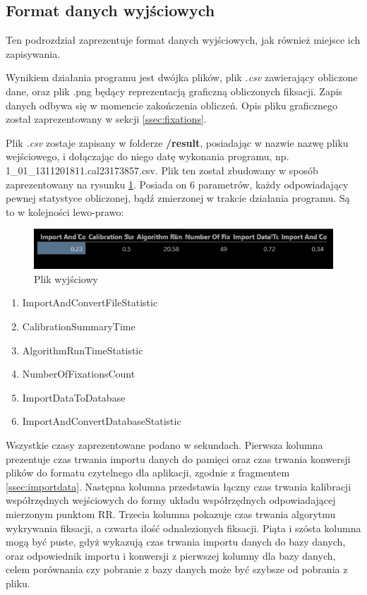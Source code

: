 \subsection{Format danych wyjściowych}
Ten podrozdział zaprezentuje format danych wyjściowych, jak również miejsce ich zapisywania.\par
Wynikiem działania programu jest dwójka plików, plik \emph{.csv} zawierający obliczone dane, oraz plik .png będący reprezentacją graficzną obliczonych fiksacji. Zapis danych odbywa się w momencie zakończenia obliczeń. Opis pliku graficznego został zaprezentowany w sekcji \ref{ssec:fixations}.\par
Plik \emph{.csv} zostaje zapisany w folderze \textbf{/result}, posiadając w nazwie nazwę pliku wejściowego, i dołączając do niego datę wykonania programu, np. 1\_01\_1311201811.cal23\-173857.csv.
Plik ten został zbudowany w sposób zaprezentowany na rysunku \ref{fig:exportfile}. Posiada on 6 parametrów, każdy odpowiadający pewnej statystyce obliczonej, bądź zmierzonej w trakcie działania programu. Są to w kolejności lewo-prawo:
\begin{figure}[H]
        \centering
        \captionsetup{justification=centering,margin=2cm}
        \includegraphics[width=0.8\linewidth]{resources/exportfile.png}
        \caption{Plik wyjściowy}
        \label{fig:exportfile}
\end{figure}
\begin{enumerate}
        \itemsep1em 
        \item ImportAndConvertFileStatistic
        \item CalibrationSummaryTime
        \item AlgorithmRunTimeStatistic
        \item NumberOfFixationsCount
        \item ImportDataToDatabase
        \item ImportAndConvertDatabaseStatistic
\end{enumerate}
Wszystkie czasy zaprezentowane podano w sekundach. Pierwsza kolumna prezentuje czas trwania importu danych do pamięci oraz czas trwania konwersji plików do formatu czytelnego dla aplikacji, zgodnie z fragmentem \ref{ssec:importdata}. Następna kolumna przedstawia łączny czas trwania kalibracji współrzędnych wejściowych do formy układu współrzędnych odpowiadającej mierzonym punktom RR. Trzecia kolumna pokazuje czas trwania algorytmu wykrywania fiksacji, a czwarta ilość odnalezionych fiksacji. Piąta i szósta kolumna mogą być puste, gdyż wykazują czas trwania importu danych do bazy danych, oraz odpowiednik importu i konwersji z pierwszej kolumny dla bazy danych, celem porównania czy pobranie z bazy danych może być szybsze od pobrania z pliku. \par
